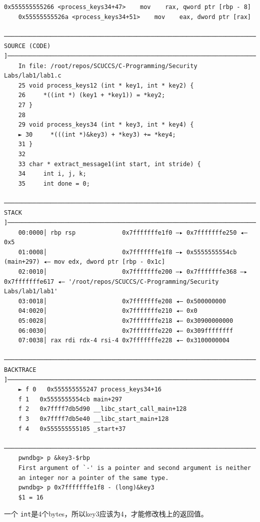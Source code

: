 \documentclass[a4pper,12pt,onecolumn]{article}
\begin{document}
\begin{lstlisting}[style=DOS]
    0x555555555266 <process_keys34+47>    mov    rax, qword ptr [rbp - 8]
    0x55555555526a <process_keys34+51>    mov    eax, dword ptr [rax]
    ─────────────────────────────────────────────────────────────────────────────────────────[ SOURCE (CODE) ]─────────────────────────────────────────────────────────────────────────────────────────
    In file: /root/repos/SCUCCS/C-Programming/Security Labs/lab1/lab1.c
    25 void process_keys12 (int * key1, int * key2) {
    26     *((int *) (key1 + *key1)) = *key2;
    27 }
    28 
    29 void process_keys34 (int * key3, int * key4) {
    ► 30     *(((int *)&key3) + *key3) += *key4;
    31 }
    32 
    33 char * extract_message1(int start, int stride) {
    34     int i, j, k;
    35     int done = 0;
    ─────────────────────────────────────────────────────────────────────────────────────────────[ STACK ]─────────────────────────────────────────────────────────────────────────────────────────────
    00:0000│ rbp rsp             0x7fffffffe1f0 —▸ 0x7fffffffe250 ◂— 0x5
    01:0008│                     0x7fffffffe1f8 —▸ 0x5555555554cb (main+297) ◂— mov edx, dword ptr [rbp - 0x1c]
    02:0010│                     0x7fffffffe200 —▸ 0x7fffffffe368 —▸ 0x7fffffffe617 ◂— '/root/repos/SCUCCS/C-Programming/Security Labs/lab1/lab1'
    03:0018│                     0x7fffffffe208 ◂— 0x500000000
    04:0020│                     0x7fffffffe210 ◂— 0x0
    05:0028│                     0x7fffffffe218 ◂— 0x30900000000
    06:0030│                     0x7fffffffe220 ◂— 0x309ffffffff
    07:0038│ rax rdi rdx-4 rsi-4 0x7fffffffe228 ◂— 0x3100000004
    ───────────────────────────────────────────────────────────────────────────────────────────[ BACKTRACE ]───────────────────────────────────────────────────────────────────────────────────────────
    ► f 0   0x555555555247 process_keys34+16
    f 1   0x5555555554cb main+297
    f 2   0x7ffff7db5d90 __libc_start_call_main+128
    f 3   0x7ffff7db5e40 __libc_start_main+128
    f 4   0x555555555105 _start+37
    ───────────────────────────────────────────────────────────────────────────────────────────────────────────────────────────────────────────────────────────────────────────────────────────────────
    pwndbg> p &key3-$rbp
    First argument of `-' is a pointer and second argument is neither
    an integer nor a pointer of the same type.
    pwndbg> p 0x7fffffffe1f8 - (long)&key3
    $1 = 16
\end{lstlisting}

一个 \texttt{int}是4个bytes，所以key3应该为4，才能修改栈上的返回值。
\end{document}
